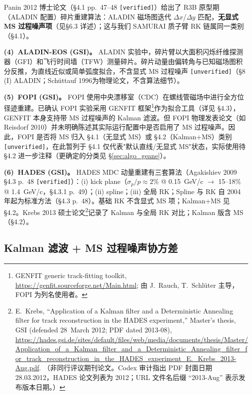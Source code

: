 \documentclass[a4paper, 11pt]{article}
\begin{document}
Panin 2012 博士论文（§4.1 pp.~47--48 \texttt{[verified]}）给出了 R3B 原型期（ALADIN 配置）碎片重建算法：ALADIN 磁场图迭代 $\Delta x$/$\Delta y$ 匹配，\textbf{无显式 MS 过程噪声项}（见§6.3 详述）；这与我们 SAMURAI 质子臂 RK 链属同一类别（§4.1）。

\textbf{(4)~ALADIN-EOS (GSI)。}
ALADIN 实验中，碎片臂以大面积闪烁纤维探测器（GFI）和飞行时间墙（TFW）测量碎片。碎片动量由偏转角与已知磁场图积分反推，为直线近似或简单弧度拟合，不含显式 MS 过程噪声 \texttt{[unverified]}（§8 (I) ALADIN；Schüttauf 1996为物理论文，不含算法细节）。

\textbf{(5)~FOPI (GSI)。}
FOPI 使用中央漂移室（CDC）在螺线管磁场中进行全方位径迹重建。已确认 FOPI 实验采用 GENFIT 框架\footnote{\label{fn:genfit_web}GENFIT generic track-fitting toolkit, \url{https://genfit.sourceforge.net/Main.html}; 由 J.~Rauch, T.~Schlüter 主导，FOPI 为列名使用者。}作为拟合工具（详见 §4.3），GENFIT 本身支持带 MS 过程噪声的 Kalman 滤波。但 FOPI 物理发表论文（如 Reisdorf 2010）并未明确陈述其实际运行配置中是否启用了 MS 过程噪声。因此，FOPI 是否将 MS 归入 §4.1（无显式 MS）或 §4.2（Kalman+MS）类别 \texttt{[unverified]}，在此暂列于 §4.1 仅代表"默认直线/无显式 MS"状态，实际使用待 §4.2 进一步注释（更确定的分类见 §\ref{sec:algo_geane}）。

\textbf{(6)~HADES (GSI)。}
HADES MDC 动量重建有三套算法（Agakishiev 2009 §4.3 p.~48 \texttt{[verified]}）：(i) kick plane（$\sigma_p/p \approx 2\%$ @ 0.15~GeV/c $\to$ 15--18\% @ 1.4~GeV/c，§4.3.1 p.~49）；(ii) spline；(iii) 全局 RK；Spline 与 RK 自 2004 年起为标准方法（§4.3 p.~48）。基础 RK 不含显式 MS 项；Kalman+MS 见 §4.2。Krebs 2013 硕士论文\footnote{\label{fn:krebs2013}E.~Krebs, ``Application of a Kalman filter and a Deterministic Annealing filter for track reconstruction in the HADES experiment,'' Master's thesis, GSI (defended 28~March 2012; PDF dated 2013-08), \url{https://hades.gsi.de/sites/default/files/web/media/documents/thesis/Master/Application_of_a_Kalman_filter_and_a_Deterministic_Annealing_filter_for_track_reconstruction_in_the_HADES_experiment_E._Krebs_2013-Aug.pdf}. （非同行评议期刊论文。Codex 审计指出 PDF 封面日期 28.03.2012，HADES 论文列表为 2012；URL 文件名后缀 ``2013-Aug'' 表示发布版本日期。）}记录了 Kalman 与全局 RK 对比；Kalman 版含 MS（§4.2）。

\subsection{Kalman 滤波 + MS 过程噪声协方差}
\label{sec:algo_kalman}
\end{document}
